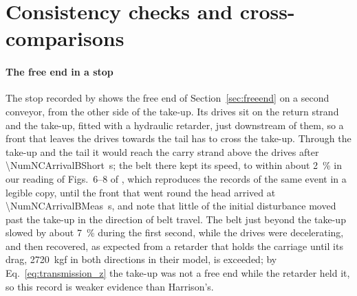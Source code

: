\section{Consistency checks and cross-comparisons}\label{app:validation}

\paragraph{The free end in a stop} The stop recorded by \citet{nordell1984} shows the free end
of Section~\ref{sec:freeend} on a second conveyor, from the other side of the take-up. Its drives
sit on the return strand and the take-up, fitted with a hydraulic retarder, just downstream of
them, so a front that leaves the drives towards the tail has to cross the take-up. Through the
take-up and the tail it would reach the carry strand above the drives after
\qty{\NumNCArrivalBShort}{\second}; the belt there kept its speed, to within about
\qty{2}{\percent} in our reading of Figs.~6--8 of \citet{nordell1987}, which reproduces the
records of the same event in a legible copy, until the front that went round the head arrived at
\qty{\NumNCArrivalBMeas}{\second}, and \citet{nordell1984} note that little of the initial
disturbance moved past the take-up in the direction of belt travel. The belt just beyond the
take-up slowed by about \qty{7}{\percent} during the first second, while the drives were
decelerating, and then recovered, as expected from a retarder that holds the carriage until its
drag, 2720~kgf in both directions in their model, is exceeded; by Eq.~\eqref{eq:transmission_z}
the take-up was not a free end while the retarder held it, so this record is weaker evidence
than Harrison's.

